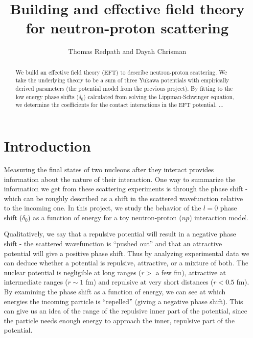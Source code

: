 \documentclass[10pt,showpacs,preprintnumbers,footinbib,amsmath,amssymb,aps,prl,twocolumn,groupedaddress,superscriptaddress,showkeys]{revtex4-1}
\begin{document}
\title{Building and effective field theory for neutron-proton scattering}
\author{Thomas Redpath and Dayah Chrisman}
\begin{abstract}

We build an effective field theory (EFT) to describe neutron-proton scattering. We take the
underlying theory to be a sum of three Yukawa potentials with empirically derived parameters
(the potential model from the previous project). By fitting to the low energy phase shifts
($\delta _0$) calculated from solving the Lippman-Schwinger equation, we determine the
coefficients for the contact interactions in the EFT potential. ...


\end{abstract}
\maketitle

\section{Introduction}

Measuring the final states of two nucleons after they interact provides information about
the nature of their interaction. One way to summarize the information we get from these
scattering experiments is through the phase shift - which can be roughly described as a
shift in the scattered wavefunction relative to the incoming one. In this project, we study
the behavior of the $l=0$ phase shift ($\delta _0$) as a function of energy for a toy
neutron-proton ($np$) interaction model.

Qualitatively, we say that a repulsive potential will result in a negative
phase shift - the scattered wavefunction is ``pushed out'' and that an attractive potential
will give a positive phase shift. Thus by analyzing experimental data we can deduce whether
a potential is repulsive, attractive, or a mixture of both. The nuclear potential is negligible at
long ranges ($r >$ a few fm), attractive at intermediate ranges ($r \sim 1$ fm) and repulsive
at very short distances ($r < 0.5$ fm). By examining the phase shift as a function of energy,
we can see at which energies the incoming particle is ``repelled'' (giving a negative phase
shift). This can give us an idea of the range of the repulsive inner part of the potential, since
the particle needs enough energy to approach the inner, repulsive part of the potential.
\end{document}
